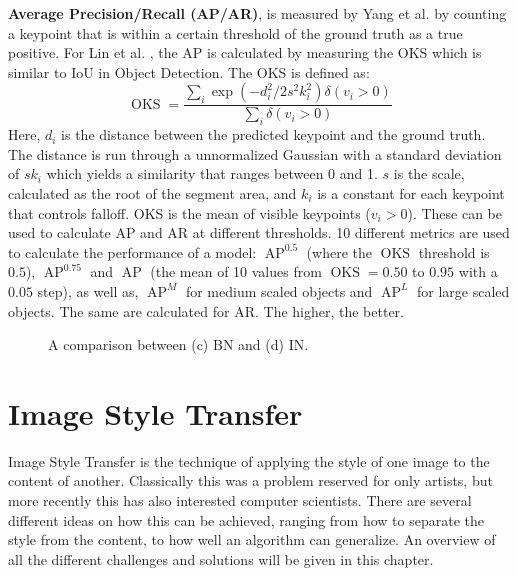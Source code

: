 \textbf{Average Precision/Recall (AP/AR)}, is measured by Yang et al. \cite{Yang2013} by counting a keypoint that is within a certain threshold of the ground truth as a true positive.
For Lin et al. \cite{Lin2014}, the AP is calculated by measuring the \gls{OKS} which is similar to \gls{IoU} in Object Detection.
The \gls{OKS} is defined as:
\begin{equation}
	\operatorname{OKS} = \frac{\sum_{i}\exp(-d_i^2/2s^2k_i^2)\delta(v_i > 0)}{\sum_i \delta(v_i > 0)}
\end{equation}
Here, $d_i$ is the distance between the predicted keypoint and the ground truth.
The distance is run through a unnormalized Gaussian with a standard deviation of $sk_i$ which yields a similarity that ranges between 0 and 1.
$s$ is the scale, calculated as the root of the segment area, and $k_i$ is a constant for each keypoint that controls falloff.
\gls{OKS} is the mean of visible keypoints ($v_i > 0$).
These can be used to calculate \gls{AP} and \gls{AR} at different thresholds.
10 different metrics are used to calculate the performance of a model:
$\operatorname{AP}^{0.5}$ (where the $\operatorname{OKS}$ threshold is $0.5$), $\operatorname{AP}^{0.75}$ and $\operatorname{AP}$ (the mean of 10 values from $\operatorname{OKS}=0.50$ to $0.95$ with a $0.05$ step), as well as, $\operatorname{AP}^{M}$ for medium scaled objects and $\operatorname{AP}^{L}$ for large scaled objects.
The same are calculated for \gls{AR}.
The higher, the better.

\begin{figure}
	\centering
	\caption{A comparison between (c) \gls{BN} and (d) \gls{IN}.\cite{Ulyanov2017}}
	\label{fig:style_transfer_ulyanov_BN_IN_comparison}
\end{figure}

\section{Image Style Transfer}
Image Style Transfer is the technique of applying the style of one image to the content of another.
Classically this was a problem reserved for only artists, but more recently this has also interested computer scientists.
There are several different ideas on how this can be achieved,
ranging from how to separate the style from the content, to how well an algorithm can generalize.
An overview of all the different challenges and solutions will be given in this chapter.

